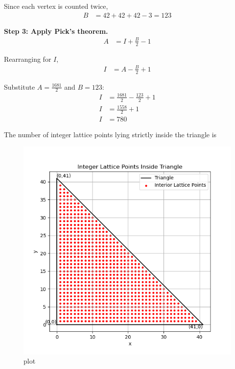 \documentclass[journal]{IEEEtran}
\begin{document}
Since each vertex is counted twice,
\begin{align}
B &= 42 + 42 + 42 - 3 = 123
\end{align}

\textbf{Step 3: Apply Pick's theorem.}
\begin{align}
A &= I + \frac{B}{2} - 1
\end{align}

Rearranging for $I$,
\begin{align}
I &= A - \frac{B}{2} + 1
\end{align}

Substitute $A = \frac{1681}{2}$ and $B = 123$:
\begin{align}
I &= \frac{1681}{2} - \frac{123}{2} + 1 \\
I &= \frac{1558}{2} + 1 \\
I &= 780
\end{align}

The number of integer lattice points lying strictly inside the triangle is


\begin{figure}[H]
\centering
\includegraphics[width=0.75\columnwidth]{figs/9.png}
\caption{\centering plot}
\label{figs:traingle points}
\end{figure}
\end{document}
